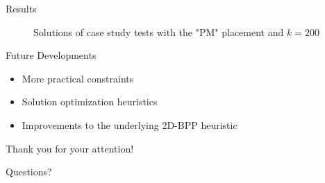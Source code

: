 \documentclass{beamer}
\begin{document}
    \begin{frame}{Results}
        \begin{figure}
            \centering
            \caption*{Solutions of case study tests with the "PM" placement and $k=200$}
            \label{fig:usecase_tests}
        \end{figure}
    \end{frame}

    \begin{frame}{Future Developments}
        \begin{itemize}
            \item More practical constraints
            \item Solution optimization heuristics
            \item Improvements to the underlying 2D-BPP heuristic
        \end{itemize}
    \end{frame}

    \begin{frame}{}
        \centering
        Thank you for your attention!

        Questions?
    \end{frame}
\end{document}
